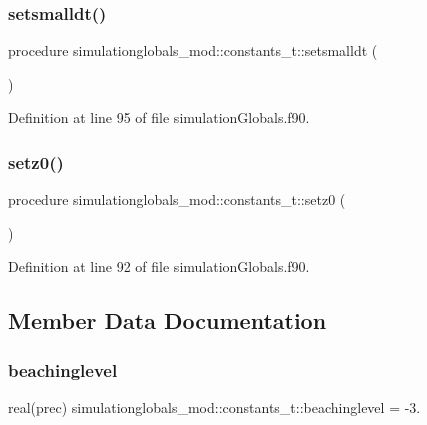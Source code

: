 \subsubsection{\texorpdfstring{setsmalldt()}{setsmalldt()}}
{\footnotesize\ttfamily procedure simulationglobals\+\_\+mod\+::constants\+\_\+t\+::setsmalldt (\begin{DoxyParamCaption}{ }\end{DoxyParamCaption})\hspace{0.3cm}{\ttfamily [private]}}



Definition at line 95 of file simulation\+Globals.\+f90.

\mbox{\label{structsimulationglobals__mod_1_1constants__t_a6517422a0987640f0574bcce3c6566f1}} 
\subsubsection{\texorpdfstring{setz0()}{setz0()}}
{\footnotesize\ttfamily procedure simulationglobals\+\_\+mod\+::constants\+\_\+t\+::setz0 (\begin{DoxyParamCaption}{ }\end{DoxyParamCaption})\hspace{0.3cm}{\ttfamily [private]}}



Definition at line 92 of file simulation\+Globals.\+f90.



\subsection{Member Data Documentation}
\mbox{\label{structsimulationglobals__mod_1_1constants__t_a735a778cb615271495fe8d5dc2b964b7}} 
\subsubsection{\texorpdfstring{beachinglevel}{beachinglevel}}
{\footnotesize\ttfamily real(prec) simulationglobals\+\_\+mod\+::constants\+\_\+t\+::beachinglevel = -\/3.\hspace{0.3cm}{\ttfamily [private]}}



